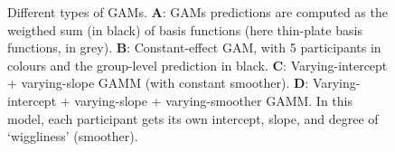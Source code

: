 \documentclass[
  doc,
  floatsintext,
  longtable,
  a4paper,
  nolmodern,
  notxfonts,
  notimes,
  colorlinks=true,linkcolor=blue,citecolor=blue,urlcolor=blue]{apa7}
\begin{document}
\begin{figure}[!htb]

\caption{\label{fig-intro-gam}Different types of GAMs. \textbf{A}: GAMs
predictions are computed as the weigthed sum (in black) of basis
functions (here thin-plate basis functions, in grey). \textbf{B}:
Constant-effect GAM, with 5 participants in colours and the group-level
prediction in black. \textbf{C}: Varying-intercept + varying-slope GAMM
(with constant smoother). \textbf{D}: Varying-intercept + varying-slope
+ varying-smoother GAMM. In this model, each participant gets its own
intercept, slope, and degree of `wiggliness' (smoother).}


\end{figure}%
\end{document}
